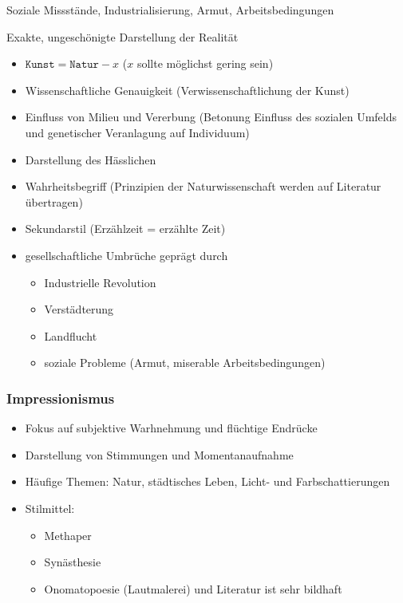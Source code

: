  Soziale Missstände, Industrialisierung, Armut, Arbeitsbedingungen

 Exakte, ungeschönigte Darstellung der Realität

\begin{itemize}
    \item $\texttt{Kunst} = \texttt{Natur} - x$ ($x$ sollte möglichst gering sein)
    \item Wissenschaftliche Genauigkeit (Verwissenschaftlichung der Kunst)
    \item Einfluss von Milieu und Vererbung (Betonung Einfluss des sozialen Umfelds und genetischer Veranlagung auf Individuum)
    \item Darstellung des Hässlichen
    \item Wahrheitsbegriff (Prinzipien der Naturwissenschaft werden auf Literatur übertragen)
    \item Sekundarstil (Erzählzeit = erzählte Zeit)
\end{itemize}

\begin{itemize}
    \item gesellschaftliche Umbrüche geprägt durch 
    \begin{itemize}
        \item Industrielle Revolution
        \item Verstädterung
        \item Landflucht
        \item soziale Probleme (Armut, miserable Arbeitsbedingungen)
    \end{itemize}
\end{itemize}


\subsubsection{Impressionismus}
\begin{itemize}
    \item Fokus auf subjektive Warhnehmung und flüchtige Endrücke
    \item Darstellung von Stimmungen und Momentanaufnahme
    \item Häufige Themen: Natur, städtisches Leben, Licht- und Farbschattierungen
    \item Stilmittel:
    \begin{itemize}
        \item Methaper
        \item Synästhesie
        \item Onomatopoesie (Lautmalerei) und Literatur ist sehr bildhaft
    \end{itemize}
\end{itemize}


